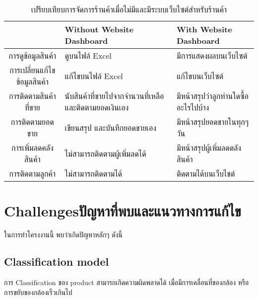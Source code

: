 \begin{table}[htbp]
    \centering
    \caption{เปรียบเทียบการจัดการร้านค้าเมื่อไม่มีและมีระบบเว็บไซต์สำหรับร้านค้า}
    \begin{tabularx}{\textwidth}{ |c|X|X| }
        \hline
        \textbf{}            & \textbf{Without Website Dashboard}         & \textbf{With Website Dashboard} \\
        \hline
        การดูข้อมูลสินค้า         & ดูบนไฟล์ Excel                               & มีการแสดงผลบนเว็บไซต์              \\
        \hline
        การเปลี่ยนแก้ไขข้อมูลสินค้า & แก้ไขบนไฟล์ Excel                            & แก้ไขบนเว็บไซต์                    \\
        \hline
        การติดตามสินค้าที่ขาย     & นับสินค้าที่ขายไปจากจำนวนที่เหลือ และติดตามยอดเงินเอง & มีหน้าสรุปว่าลูกท่านใดซื้ออะไรไปบ้าง     \\
        \hline
        การติดตามยอดขาย       & เขียนสรุป และบันทึกยอดขายเอง                   & มีหน้าสรุปยอดขายในทุกๆวัน            \\
        \hline
        การเพิ่มลดคลังสินค้า      & ไม่สามารถติดตามผู้เพิ่มลดได้                      & มีหน้าสรุปผู้เพิ่มลดตลังสินค้า            \\
        \hline
        การติดตามลูกค้า         & ไม่สามารถติดตามได้                            & ติดตามได้บนเว็บไชต์                 \\
        \hline
    \end{tabularx}
\end{table}
\section{\ifenglish Challenges\else ปัญหาที่พบและแนวทางการแก้ไข\fi}
ในการทำโครงงานนี้ พบว่าเกิดปัญหาหลักๆ ดังนี้

\subsection{Classification model}
\par การ Classification ของ product สามารถเกิดความผิดพลาดได้ เมื่อมีการเคลื่อนที่ของกล้อง หรือการขยับของกล้องเร็วเกินไป

